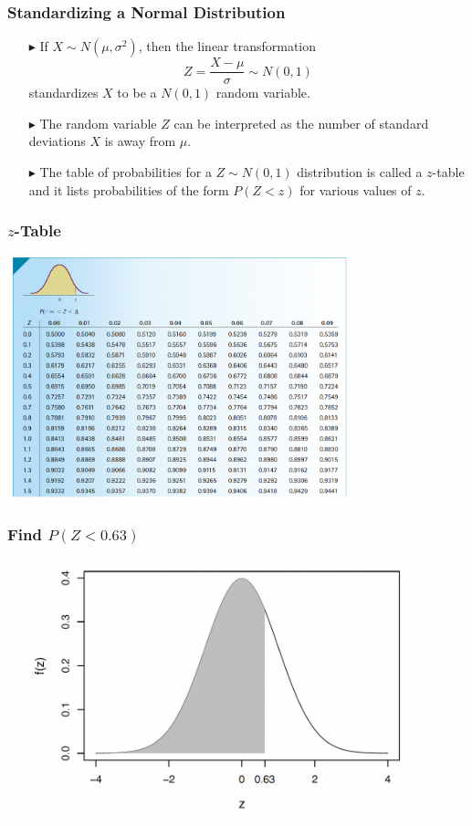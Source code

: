 \documentclass[12pt]{beamer}
\begin{document}
\begin{frame}
	\frametitle{Standardizing a Normal Distribution}
	
	\begin{itemize}
		\item[\color{blue}$\blacktriangleright$] If $X \sim N(\mu, \sigma^2)$, then the linear transformation
		\[
		Z = \frac{X - \mu}{\sigma} \sim N(0,1)
		\]
		standardizes $X$ to be a $N(0,1)$ random variable.
		
		\item[\color{blue}$\blacktriangleright$] The random variable $Z$ can be interpreted as the 
		number of standard deviations $X$ is away from $\mu$.
		
		\item[\color{blue}$\blacktriangleright$] The table of probabilities for a $Z \sim N(0,1)$ 
		distribution is called a $z$-table and it lists 
		probabilities of the form $P(Z < z)$ for various 
		values of $z$.
	\end{itemize}
	
	\end{frame}
	\begin{frame}
		\frametitle{$z$-Table}
	\centering
\includegraphics[width=10cm]{ztable.png}
	\end{frame}
		\begin{frame}
		\frametitle{Find $P(Z<0.63)$}
		\centering
		\includegraphics[width=12cm]{normal6.png}
	\end{frame}
\end{document}
